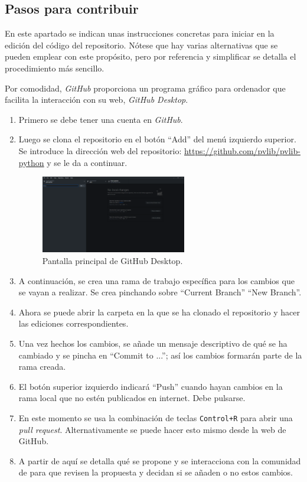 \subsection{Pasos para contribuir}

En este apartado se indican unas instrucciones concretas para iniciar en la edición del código del repositorio. Nótese que hay varias alternativas que se pueden emplear con este propósito, pero por referencia y simplificar se detalla el procedimiento más sencillo.

Por comodidad, \textit{GitHub} proporciona un programa gráfico para ordenador que facilita la interacción con su web, \textit{GitHub Desktop}.

\begin{enumerate}
    \item Primero se debe tener una cuenta en \textit{GitHub}.
    \item Luego se clona el repositorio en el botón ``Add'' del menú izquierdo superior. Se introduce la dirección web del repositorio: \url{https://github.com/pvlib/pvlib-python} y se le da a continuar.

          \begin{figure}[H]
              \centering
              \includegraphics[width=0.6\textwidth]{images/SoA_foss/GH_DKT_0.png}
              \caption{Pantalla principal de GitHub Desktop.}
              \label{fig:GH_principal}
          \end{figure}

    \item A continuación, se crea una rama de trabajo específica para los cambios que se vayan a realizar. Se crea pinchando sobre ``Current Branch'' \textrightarrow ``New Branch''.
    \item Ahora se puede abrir la carpeta en la que se ha clonado el repositorio y hacer las ediciones correspondientes.
    \item Una vez hechos los cambios, se añade un mensaje descriptivo de qué se ha cambiado y se pincha en ``Commit to ...''; así los cambios formarán parte de la rama creada.
    \item El botón superior izquierdo indicará ``Push'' cuando hayan cambios en la rama local que no estén publicados en internet. Debe pulsarse.
    \item En este momento se usa la combinación de teclas \texttt{Control+R} para abrir una \textit{pull request}. Alternativamente se puede hacer esto mismo desde la web de GitHub.
    \item A partir de aquí se detalla qué se propone y se interacciona con la comunidad de \pvlibpy{} para que revisen la propuesta y decidan si se añaden o no estos cambios.
\end{enumerate}


